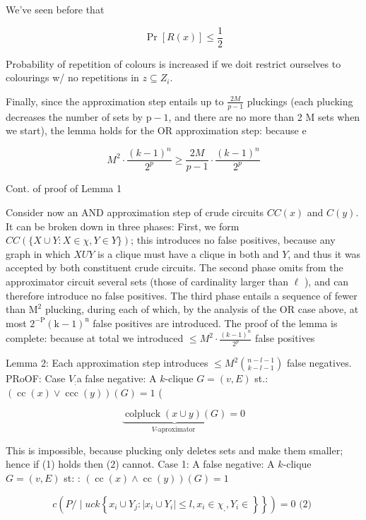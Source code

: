 We've seen before that

$$
\operatorname{Pr}[R(x)] \leqslant \frac{1}{2}
$$

Probability of repetition of colours is increased if we doit restrict ourselves to colourings w/ no repetitions in $z \subseteq Z_i$.


Finally, since the approximation step entails up to $\frac{2 M}{p-1}$ pluckings (each plucking decreases the number of sets by $\mathrm{p}-1$, and there are no more than 2 M sets when we start), the lemma holds for the OR approximation step: because e

$$
M^2 \cdot \frac{(k-1)^n}{2^p} \geq \frac{2 M}{p-1} \cdot \frac{(k-1)^n}{2^p}
$$


Cont. of proof of Lemma 1

Consider now an AND approximation step of crude circuits $C C(x)$ and $C(y)$. It can be broken down in three phases: First, we form $C C(\{X \cup Y: X \in \chi, Y \in Y\})$; this introduces no false positives, because any graph in which $X U Y$ is a clique must have a clique in both and $Y$, and thus it was accepted by both constituent crude circuits. The second phase omits from the approximator circuit several sets (those of cardinality larger than $\ell$ ), and can therefore introduce no false positives. The third phase entails a sequence of fewer than $\mathrm{M}^2$ plucking, during each of which, by the analysis of the OR case above, at most $2^{-\mathrm{P}}(\mathrm{k}-1)^{\mathrm{n}}$ false positives are introduced. The proof of the lemma is complete: because at total we introduced $\leq M^2 \cdot \frac{(k-1)^n}{2^p}$ false positives




Lemma 2: Each approximation step introduces $\leqslant M^2\binom{n-l-1}{k-l-1}$ false negatives.
PRoOF:
Case $V_{:}$a false negative:
A $k$-clique $G=(v, E)$ st.: $(\operatorname{cc}(x) \vee \operatorname{ccc}(y))(G)=1$ (

$$
\underbrace{\operatorname{colpluck}(x \cup y)(G)}_{V \text {-aproximator }}=0
$$


This is impossible, because plucking only deletes sets and make them smaller; hence if (1) holds then (2) cannot.
Case 1:
A false negative:
A $k$-clique $G=(v, E)$ st: : $(\operatorname{cc}(x) \wedge \operatorname{cc}(y))(G)=1$

$$
\left.c\left(P / \mid u c k\left\{x_i \cup Y_j:\left|x_i \cup Y_i\right| \leq l, x_i \in \chi_{,}, Y_i \in\right\}\right\}\right)=0 \text { (2) }
$$


